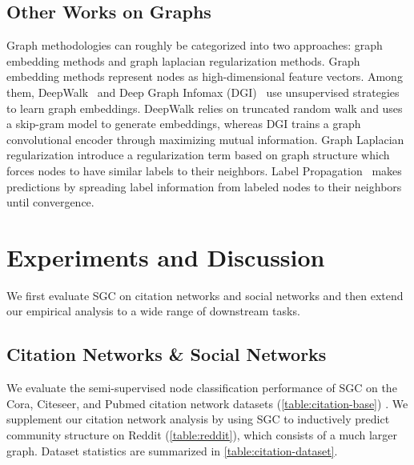 \documentclass{article}
\newcommand{\method}{SGC}
\begin{document}
\subsection{Other Works on Graphs} 
Graph methodologies can roughly be categorized into two approaches: graph embedding methods and graph laplacian regularization methods. 
Graph embedding methods \citep{Weston2008, Perozzi14, Yang16, infomax} represent nodes as high-dimensional feature vectors. 
Among them, DeepWalk~\citep{Perozzi14} and Deep Graph Infomax (DGI)~\citep{infomax} use unsupervised strategies to learn graph embeddings.
DeepWalk relies on truncated random walk and uses a skip-gram model to generate embeddings, whereas DGI trains a graph convolutional encoder through maximizing mutual information. 
Graph Laplacian regularization \citep{Zhu03, Zhou04,Belkin04b,Belkin2006} introduce a regularization term based on graph structure which forces nodes to have similar labels to their neighbors.
Label Propagation~\citep{Zhu03} makes predictions by spreading label information from labeled nodes to their neighbors until convergence.  
\section{Experiments and Discussion}
\label{sec:experiment}

We first evaluate \method{} on citation networks and social networks and then extend our empirical analysis to a wide range of downstream tasks.
\subsection{Citation Networks \& Social Networks} \label{sec:citation-networks}
We evaluate the semi-supervised node classification performance of \method{} on the Cora, Citeseer, and Pubmed citation network datasets (\autoref{table:citation-base}) \cite{sen2008collective}. 
We supplement our citation network analysis by using \method{} to inductively predict community structure on Reddit (\autoref{table:reddit}), which consists of a much larger graph. Dataset statistics are summarized in \autoref{table:citation-dataset}.
\end{document}
